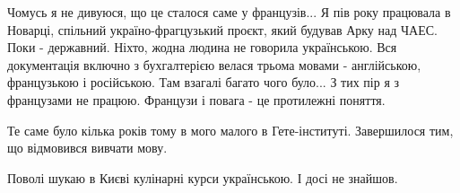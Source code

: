 \begin{itemize}
Чомусь я не дивуюся, що це сталося саме у французів... Я пів року працювала в
Новарці, спільний україно-фрагцузький проєкт, який будував Арку над ЧАЕС. Поки
- державний. Ніхто, жодна людина не говорила українською. Вся документація
включно з бухгалтерією велася трьома мовами - англійською, французькою і
російською. Там взагалі багато чого було... З тих пір я з французами не працюю.
Французи і повага - це протилежні поняття.

Те саме було кілька років тому в мого малого в Гете-інституті. Завершилося тим, що відмовився вивчати мову.

Поволі шукаю в Києві кулінарні курси українською. І досі не знайшов.

\end{itemize} %
